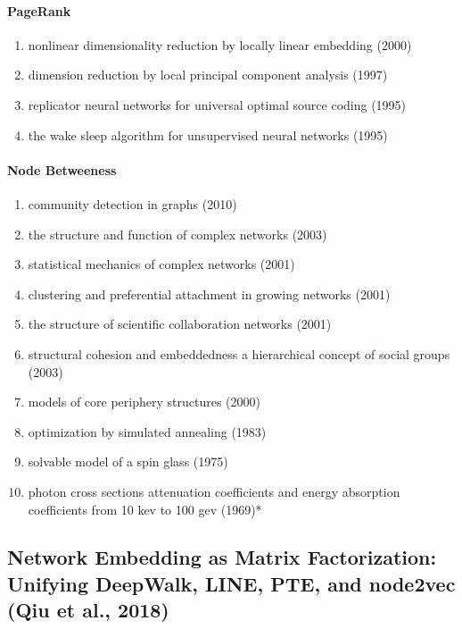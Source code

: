 \documentclass[lettepaper,]{article}
\providecommand{\tightlist}{%
  \setlength{\itemsep}{0pt}\setlength{\parskip}{0pt}}
\let\oldparagraph\paragraph
\renewcommand{\paragraph}[1]{\oldparagraph{#1}\mbox{}}
\begin{document}
\hypertarget{pagerank-3}{%
\paragraph{PageRank}\label{pagerank-3}}

\begin{enumerate}
\def\labelenumi{\arabic{enumi}.}
\tightlist
\item
  nonlinear dimensionality reduction by locally linear embedding (2000)
\item
  dimension reduction by local principal component analysis (1997)
\item
  replicator neural networks for universal optimal source coding (1995)
\item
  the wake sleep algorithm for unsupervised neural networks (1995)
\end{enumerate}

\hypertarget{node-betweeness-2}{%
\paragraph{Node Betweeness}\label{node-betweeness-2}}

\begin{enumerate}
\def\labelenumi{\arabic{enumi}.}
\tightlist
\item
  community detection in graphs (2010)
\item
  the structure and function of complex networks (2003)
\item
  statistical mechanics of complex networks (2001)
\item
  clustering and preferential attachment in growing networks (2001)
\item
  the structure of scientific collaboration networks (2001)
\item
  structural cohesion and embeddedness a hierarchical concept of social
  groups (2003)
\item
  models of core periphery structures (2000)
\item
  optimization by simulated annealing (1983)
\item
  solvable model of a spin glass (1975)
\item
  photon cross sections attenuation coefficients and energy absorption
  coefficients from 10 kev to 100 gev (1969)*
\end{enumerate}

\hypertarget{network-embedding-as-matrix-factorization-unifying-deepwalk-line-pte-and-node2vec-qiu-et-al.-2018}{%
\subsection{Network Embedding as Matrix Factorization: Unifying
DeepWalk, LINE, PTE, and node2vec (Qiu et al.,
2018)}\label{network-embedding-as-matrix-factorization-unifying-deepwalk-line-pte-and-node2vec-qiu-et-al.-2018}}
\end{document}

